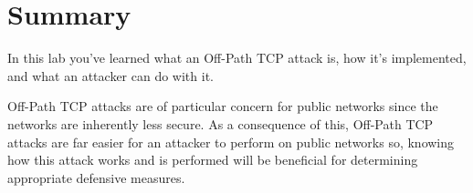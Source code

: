 \documentclass[letterpaper,12pt]{report}
\begin{document}
\section*{Summary}\label{sec:Summary}

In this lab you've learned what an Off-Path TCP attack is, how it's implemented, and what an attacker can do with it.

Off-Path TCP attacks are of particular concern for public networks since the networks are inherently less secure. As a consequence of this, Off-Path TCP attacks are far easier for an attacker to perform on public networks so, knowing how this attack works and is performed will be beneficial for determining appropriate defensive measures.



\end{document}
